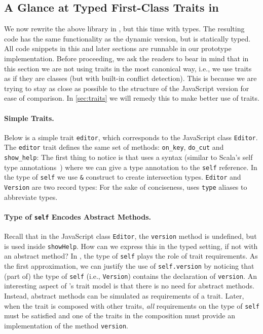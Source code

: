 \subsection{A Glance at Typed First-Class Traits in \sedel}

We now rewrite the above library in \sedel, but this time with types. The resulting code has the same functionality as the dynamic version, but is
statically typed. All code snippets in this and later sections are runnable in
our prototype implementation. Before proceeding, we ask the readers to bear in mind that in this section we are not using traits
in the most canonical way, i.e., we use traits as if they are classes (but with
built-in conflict detection). This is because we are trying to stay as close as possible
to the structure of the JavaScript version for ease of comparison. In
\cref{sec:traits} we will remedy this to make better use of traits.

\paragraph{Simple Traits.}
Below is a simple trait \lstinline{editor}, which corresponds to the JavaScript
class \lstinline{Editor}. The \lstinline{editor} trait defines the same set of
methods: \lstinline{on_key}, \lstinline{do_cut} and \lstinline{show_help}:
The first thing to notice is that \sedel uses a syntax (similar to Scala's
self type annotations~\citep{odersky2004overview}) where we can give a type annotation to the
\lstinline{self} reference. In the type of \lstinline{self} we use
\lstinline{&} construct to create intersection types. \lstinline{Editor} and \lstinline{Version} are two record types:
For the sake of conciseness, \sedel uses \lstinline{type} aliases to abbreviate types.

\paragraph{Type of \lstinline{self} Encodes Abstract Methods.}
Recall that in the JavaScript class \lstinline{Editor}, the \lstinline{version}
method is undefined, but is used inside \lstinline{showHelp}. How can we express
this in the typed setting, if not with an abstract method? In \sedel, the type of \lstinline{self}
plays the role of trait requirements. As the first approximation, we
can justify the use of \lstinline{self.version} by noticing that (part of) the
type of \lstinline{self} (i.e., \lstinline{Version}) contains the declaration of
\lstinline{version}. An interesting aspect of \sedel's trait model is that there
is no need for abstract methods. Instead, abstract methods can be simulated as
requirements of a trait. Later, when the trait is composed with other
traits, \emph{all} requirements on the type of \lstinline{self} must be
satisfied and one of the traits in the composition must provide an
implementation of the method \lstinline{version}.

